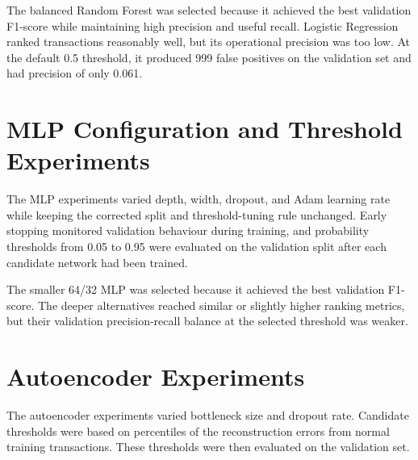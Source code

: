 \documentclass[12pt,a4paper]{report}
\begin{document}
The balanced Random Forest was selected because it achieved the best validation F1-score while maintaining high precision and useful recall. Logistic Regression ranked transactions reasonably well, but its operational precision was too low. At the default 0.5 threshold, it produced 999 false positives on the validation set and had precision of only 0.061.

\section{MLP Configuration and Threshold Experiments}

The MLP experiments varied depth, width, dropout, and Adam learning rate while keeping the corrected split and threshold-tuning rule unchanged. Early stopping monitored validation behaviour during training, and probability thresholds from 0.05 to 0.95 were evaluated on the validation split after each candidate network had been trained.

\begin{table}[htbp]
    \centering
    \caption{Best validation result for each MLP configuration after threshold tuning.}
\end{table}

The smaller 64/32 MLP was selected because it achieved the best validation F1-score. The deeper alternatives reached similar or slightly higher ranking metrics, but their validation precision-recall balance at the selected threshold was weaker.

\section{Autoencoder Experiments}

The autoencoder experiments varied bottleneck size and dropout rate. Candidate thresholds were based on percentiles of the reconstruction errors from normal training transactions. These thresholds were then evaluated on the validation set.
\end{document}
